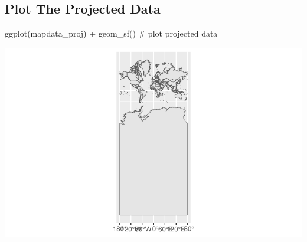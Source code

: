 \documentclass[
  letterpaper,
  DIV=11,
  numbers=noendperiod,
  oneside]{scrreprt}
\newenvironment{Shaded}{\begin{snugshade}}{\end{snugshade}}
\newcommand{\CommentTok}[1]{\textcolor[rgb]{0.37,0.37,0.37}{#1}}
\newcommand{\FunctionTok}[1]{\textcolor[rgb]{0.28,0.35,0.67}{#1}}
\newcommand{\NormalTok}[1]{\textcolor[rgb]{0.00,0.23,0.31}{#1}}
\newcommand{\SpecialCharTok}[1]{\textcolor[rgb]{0.37,0.37,0.37}{#1}}
\begin{document}
\subsection{Plot The Projected Data}\label{plot-the-projected-data}

\begin{Shaded}
\begin{Highlighting}[]
\FunctionTok{ggplot}\NormalTok{(mapdata\_proj) }\SpecialCharTok{+} 
  \FunctionTok{geom\_sf}\NormalTok{() }\CommentTok{\# plot projected data}
\end{Highlighting}
\end{Shaded}

\includegraphics{cartogram_files/figure-pdf/unnamed-chunk-6-1.pdf}
\end{document}
